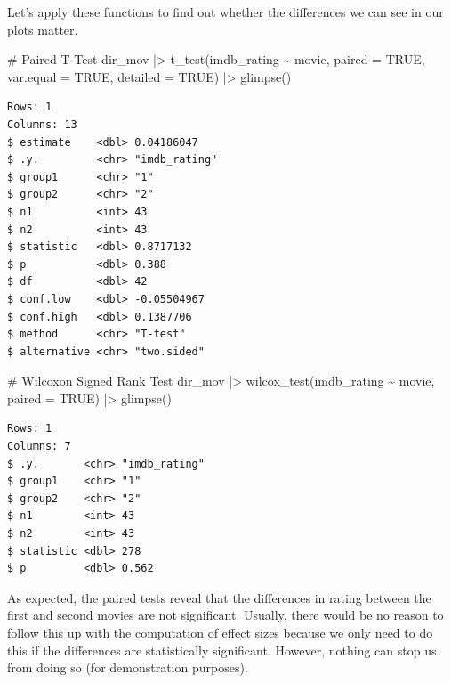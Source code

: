 \documentclass[
  letterpaper,
]{krantz}
\makeatletter
\newenvironment{Shaded}{\begin{snugshade}}{\end{snugshade}}
\newcommand{\AttributeTok}[1]{\textcolor[rgb]{0.40,0.45,0.13}{#1}}
\newcommand{\CommentTok}[1]{\textcolor[rgb]{0.37,0.37,0.37}{#1}}
\newcommand{\ConstantTok}[1]{\textcolor[rgb]{0.56,0.35,0.01}{#1}}
\newcommand{\FunctionTok}[1]{\textcolor[rgb]{0.28,0.35,0.67}{#1}}
\newcommand{\NormalTok}[1]{\textcolor[rgb]{0.00,0.23,0.31}{#1}}
\newcommand{\SpecialCharTok}[1]{\textcolor[rgb]{0.37,0.37,0.37}{#1}}
\newenvironment{kframe}{%
\medskip{}
\setlength{\fboxsep}{.8em}
 \def\at@end@of@kframe{}%
 \ifinner\ifhmode%
  \def\at@end@of@kframe{\end{minipage}}%
  \begin{minipage}{\columnwidth}%
 \fi\fi%
 \def\FrameCommand##1{\hskip\@totalleftmargin \hskip-\fboxsep
 \colorbox{shadecolor}{##1}\hskip-\fboxsep
     \hskip-\linewidth \hskip-\@totalleftmargin \hskip\columnwidth}%
 \MakeFramed {\advance\hsize-\width
   \@totalleftmargin\z@ \linewidth\hsize
   \@setminipage}}%
 {\par\unskip\endMakeFramed%
 \at@end@of@kframe}
\renewenvironment{Shaded}{\begin{kframe}}{\end{kframe}}
\makeatother
\begin{document}
Let's apply these functions to find out whether the differences we can
see in our plots matter.

\begin{Shaded}
\begin{Highlighting}[]
\CommentTok{\# Paired T{-}Test}
\NormalTok{dir\_mov }\SpecialCharTok{|\textgreater{}} \FunctionTok{t\_test}\NormalTok{(imdb\_rating }\SpecialCharTok{\textasciitilde{}}\NormalTok{ movie,}
                   \AttributeTok{paired =} \ConstantTok{TRUE}\NormalTok{,}
                   \AttributeTok{var.equal =} \ConstantTok{TRUE}\NormalTok{,}
                   \AttributeTok{detailed =} \ConstantTok{TRUE}\NormalTok{) }\SpecialCharTok{|\textgreater{}}
  \FunctionTok{glimpse}\NormalTok{()}
\end{Highlighting}
\end{Shaded}

\begin{verbatim}
Rows: 1
Columns: 13
$ estimate    <dbl> 0.04186047
$ .y.         <chr> "imdb_rating"
$ group1      <chr> "1"
$ group2      <chr> "2"
$ n1          <int> 43
$ n2          <int> 43
$ statistic   <dbl> 0.8717132
$ p           <dbl> 0.388
$ df          <dbl> 42
$ conf.low    <dbl> -0.05504967
$ conf.high   <dbl> 0.1387706
$ method      <chr> "T-test"
$ alternative <chr> "two.sided"
\end{verbatim}

\begin{Shaded}
\begin{Highlighting}[]
\CommentTok{\# Wilcoxon Signed Rank Test}
\NormalTok{dir\_mov }\SpecialCharTok{|\textgreater{}} \FunctionTok{wilcox\_test}\NormalTok{(imdb\_rating }\SpecialCharTok{\textasciitilde{}}\NormalTok{ movie,}
                         \AttributeTok{paired =} \ConstantTok{TRUE}\NormalTok{) }\SpecialCharTok{|\textgreater{}}
  \FunctionTok{glimpse}\NormalTok{()}
\end{Highlighting}
\end{Shaded}

\begin{verbatim}
Rows: 1
Columns: 7
$ .y.       <chr> "imdb_rating"
$ group1    <chr> "1"
$ group2    <chr> "2"
$ n1        <int> 43
$ n2        <int> 43
$ statistic <dbl> 278
$ p         <dbl> 0.562
\end{verbatim}

As expected, the paired tests reveal that the differences in rating
between the first and second movies are not significant. Usually, there
would be no reason to follow this up with the computation of effect
sizes because we only need to do this if the differences are
statistically significant. However, nothing can stop us from doing so
(for demonstration purposes).
\end{document}
